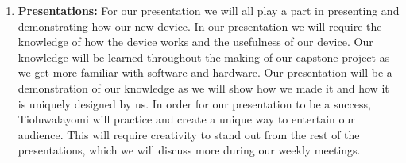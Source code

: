 \documentclass[12pt,titlepage]{article}
\begin{document}
\begin{enumerate}
  \newpage
  
  \item \textbf{Presentations:} For our presentation we will all play a part in presenting and demonstrating how our new device. In our presentation we will require the knowledge of how the device works and the usefulness of our device. Our knowledge will be learned throughout the making of our capstone project as we get more familiar with software and hardware. Our presentation will be a demonstration of our knowledge as we will show how we made it and how it is uniquely designed by us. In order for our presentation to be a success, Tioluwalayomi will practice and create a unique way to entertain our audience. This will require creativity to stand out from the rest of the presentations, which we will discuss more during our weekly meetings.
  
\end{enumerate}
\end{document}

